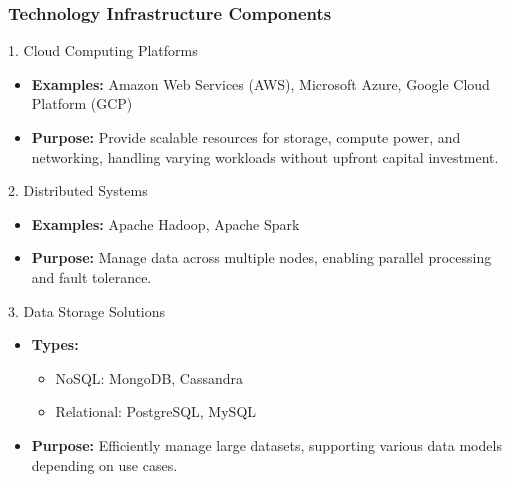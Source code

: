 \documentclass[aspectratio=169]{beamer}
\begin{document}
\begin{frame}[fragile]
    \frametitle{Technology Infrastructure Components}
    \begin{block}{1. Cloud Computing Platforms}
        \begin{itemize}
            \item \textbf{Examples:} Amazon Web Services (AWS), Microsoft Azure, Google Cloud Platform (GCP)
            \item \textbf{Purpose:} Provide scalable resources for storage, compute power, and networking, handling varying workloads without upfront capital investment.
        \end{itemize}
    \end{block}
    
    \begin{block}{2. Distributed Systems}
        \begin{itemize}
            \item \textbf{Examples:} Apache Hadoop, Apache Spark
            \item \textbf{Purpose:} Manage data across multiple nodes, enabling parallel processing and fault tolerance.
        \end{itemize}
    \end{block}
    
    \begin{block}{3. Data Storage Solutions}
        \begin{itemize}
            \item \textbf{Types:}
                \begin{itemize}
                    \item NoSQL: MongoDB, Cassandra
                    \item Relational: PostgreSQL, MySQL
                \end{itemize}
            \item \textbf{Purpose:} Efficiently manage large datasets, supporting various data models depending on use cases.
        \end{itemize}
    \end{block}
\end{frame}
\end{document}

